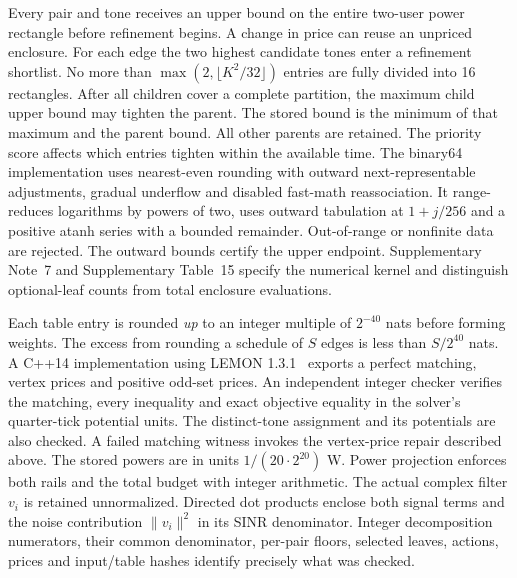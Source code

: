 \documentclass[lineno,pdflatex,sn-nature]{sn-jnl}
\begin{document}
Every pair and tone receives an upper bound on the entire two-user power rectangle before refinement begins. A change in price can reuse an unpriced enclosure. For each edge the two highest candidate tones enter a refinement shortlist. No more than \(\max(2,\lfloor K^2/32\rfloor)\) entries are fully divided into 16 rectangles. After all children cover a complete partition, the maximum child upper bound may tighten the parent. The stored bound is the minimum of that maximum and the parent bound. All other parents are retained. The priority score affects which entries tighten within the available time. The binary64 implementation uses nearest-even rounding with outward next-representable adjustments, gradual underflow and disabled fast-math reassociation. It range-reduces logarithms by powers of two, uses outward tabulation at \(1+j/256\) and a positive atanh series with a bounded remainder. Out-of-range or nonfinite data are rejected. The outward bounds certify the upper endpoint. Supplementary Note~7 and Supplementary Table~15 specify the numerical kernel and distinguish optional-leaf counts from total enclosure evaluations.

Each table entry is rounded \emph{up} to an integer multiple of \(2^{-40}\) nats before forming weights. The excess from rounding a schedule of \(S\) edges is less than \(S/2^{40}\) nats. A C++14 implementation using LEMON 1.3.1~\cite{lemon} exports a perfect matching, vertex prices and positive odd-set prices. An independent integer checker verifies the matching, every inequality and exact objective equality in the solver's quarter-tick potential units. The distinct-tone assignment and its potentials are also checked. A failed matching witness invokes the vertex-price repair described above. The stored powers are in units \(1/(20\cdot2^{20})\) W. Power projection enforces both rails and the total budget with integer arithmetic. The actual complex filter \(v_i\) is retained unnormalized. Directed dot products enclose both signal terms and the noise contribution \(\|v_i\|^2\) in its SINR denominator. Integer decomposition numerators, their common denominator, per-pair floors, selected leaves, actions, prices and input/table hashes identify precisely what was checked.
\end{document}
